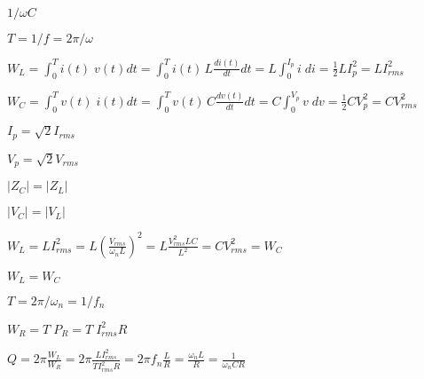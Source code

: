 \documentclass{article}
\def\lthtmlcheckvsize{\ifdim\ht\sizebox<\vsize 
  \ifdim\wd\sizebox<\hsize\expandafter\hfill\fi \expandafter\vfill
  \else\expandafter\vss\fi}%
\begin{document}
{\newpage\clearpage
{}%
$ 1/\omega C$%
\lthtmlindisplaymathZ
\lthtmlcheckvsize\clearpage}

{\newpage\clearpage
{}%
$ T=1/f=2\pi/\omega$%
\lthtmlindisplaymathZ
\lthtmlcheckvsize\clearpage}

{\newpage\clearpage
{}%
$\displaystyle W_L=\int_0^T i(t)\; v(t) dt=\int_0^T i(t) \,L \frac{di(t)}{dt} dt
=L \int_0^{I_p} i \;di=\frac{1}{2}LI_p^2=LI^2_{rms}$%
\lthtmlindisplaymathZ
\lthtmlcheckvsize\clearpage}

{\newpage\clearpage
{}%
$\displaystyle W_C=\int_0^T v(t)\; i(t) dt=\int_0^T v(t) \,C \frac{dv(t)}{dt} dt
=C \int_0^{V_p} v \;dv=\frac{1}{2}CV_p^2=CV^2_{rms}$%
\lthtmlindisplaymathZ
\lthtmlcheckvsize\clearpage}

{\newpage\clearpage
{}%
$ I_p=\sqrt{2}I_{rms}$%
\lthtmlindisplaymathZ
\lthtmlcheckvsize\clearpage}

{\newpage\clearpage
{}%
$ V_p=\sqrt{2}V_{rms}$%
\lthtmlindisplaymathZ
\lthtmlcheckvsize\clearpage}

{\newpage\clearpage
{}%
$ |Z_C|=|Z_L|$%
\lthtmlindisplaymathZ
\lthtmlcheckvsize\clearpage}

{\newpage\clearpage
{}%
$ |V_C|=|V_L|$%
\lthtmlindisplaymathZ
\lthtmlcheckvsize\clearpage}

{\newpage\clearpage
{}%
$\displaystyle W_L=LI^2_{rms}=L \left( \frac{V_{rms}}{\omega_nL}\right)^2
=L\frac{V^2_{rms}LC}{L^2}=CV^2_{rms}=W_C$%
\lthtmlindisplaymathZ
\lthtmlcheckvsize\clearpage}

{\newpage\clearpage
{}%
$ W_L=W_C$%
\lthtmlindisplaymathZ
\lthtmlcheckvsize\clearpage}

{\newpage\clearpage
{}%
$ T=2\pi/\omega_n=1/f_n$%
\lthtmlindisplaymathZ
\lthtmlcheckvsize\clearpage}

{\newpage\clearpage
{}%
$\displaystyle W_R=T\;P_R = T\;I^2_{rms} R$%
\lthtmlindisplaymathZ
\lthtmlcheckvsize\clearpage}

{\newpage\clearpage
{}%
$\displaystyle Q=2\pi\frac{W_L}{W_R}=2\pi\frac{LI^2_{rms}}{TI^2_{rms}R }
=2\pi f_n\frac{L}{R}=\frac{\omega_nL}{R}=\frac{1}{\omega_nCR}$%
\lthtmlindisplaymathZ
\lthtmlcheckvsize\clearpage}
\end{document}
